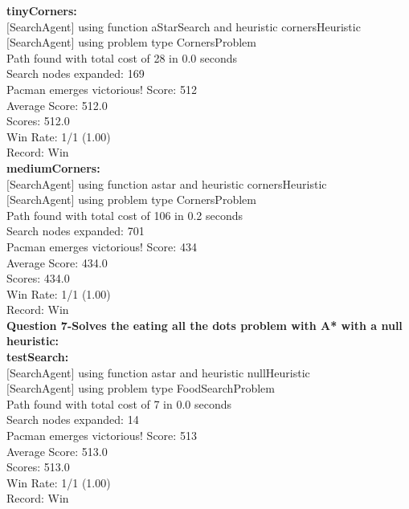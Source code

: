 \documentclass[11pt]{article}
\begin{document}
\noindent
\textbf{tinyCorners:}\\
$[$SearchAgent$]$ using function aStarSearch and heuristic cornersHeuristic\\
$[$SearchAgent$]$ using problem type CornersProblem\\
Path found with total cost of 28 in 0.0 seconds\\
Search nodes expanded: 169\\
Pacman emerges victorious! Score: 512\\
Average Score: 512.0\\
Scores:        512.0\\
Win Rate:      1/1 (1.00)\\
Record:        Win\\

\noindent
\textbf{mediumCorners:}\\
$[$SearchAgent$]$ using function astar and heuristic cornersHeuristic\\
$[$SearchAgent$]$ using problem type CornersProblem\\
Path found with total cost of 106 in 0.2 seconds\\
Search nodes expanded: 701\\
Pacman emerges victorious! Score: 434\\
Average Score: 434.0\\
Scores:        434.0\\
Win Rate:      1/1 (1.00)\\
Record:        Win\\


\newpage
\noindent
\textbf{Question 7-Solves the eating all the dots problem with A* with a null heuristic:}\\
\textbf{testSearch:}\\
$[$SearchAgent$]$ using function astar and heuristic nullHeuristic\\
$[$SearchAgent$]$ using problem type FoodSearchProblem\\
Path found with total cost of 7 in 0.0 seconds\\
Search nodes expanded: 14\\
Pacman emerges victorious! Score: 513\\
Average Score: 513.0\\
Scores:        513.0\\
Win Rate:      1/1 (1.00)\\
Record:        Win\\
\end{document}
